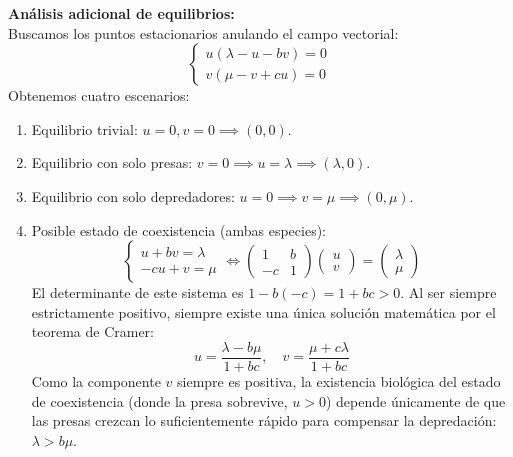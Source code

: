 {    \vspace{0.5cm}
    \textbf{Análisis adicional de equilibrios:} \\
    Buscamos los puntos estacionarios anulando el campo vectorial:
    \[
        \begin{cases}
            u(\lambda - u - bv) = 0 \\
            v(\mu - v + cu) = 0
        \end{cases}
    \]
    Obtenemos cuatro escenarios:
    \begin{enumerate}[label=\Roman*)]
        \item Equilibrio trivial: $u=0, v=0 \implies (0,0)$.
        \item Equilibrio con solo presas: $v=0 \implies u=\lambda \implies (\lambda, 0)$. 
        \item Equilibrio con solo depredadores: $u=0 \implies v=\mu \implies (0, \mu)$.
        \item Posible estado de coexistencia (ambas especies): 
        \[
            \begin{cases}
                u + bv = \lambda \\
                -cu + v = \mu
            \end{cases}
            \iff
            \begin{pmatrix} 1 & b \\ -c & 1 \end{pmatrix} \begin{pmatrix} u \\ v \end{pmatrix} = \begin{pmatrix} \lambda \\ \mu \end{pmatrix}
        \]
        El determinante de este sistema es $1 - b(-c) = 1 + bc > 0$. Al ser siempre estrictamente positivo, siempre existe una única solución matemática por el teorema de Cramer:
        \[
            u = \frac{\lambda - b\mu}{1 + bc}, \quad
            v = \frac{\mu + c\lambda}{1 + bc}
        \]
        Como la componente $v$ siempre es positiva, la existencia biológica del estado de coexistencia (donde la presa sobrevive, $u > 0$) depende únicamente de que las presas crezcan lo suficientemente rápido para compensar la depredación: $\lambda > b\mu$.
    \end{enumerate}
    
    \begin{center}
\end{center}}
